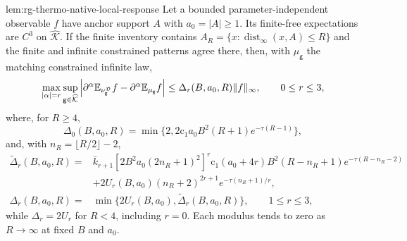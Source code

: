 {lem:rg-thermo-native-local-response}
Let a bounded parameter-independent observable $f$ have anchor support $A$
with $a_0=|A|\ge1$. Its finite-free expectations are $C^3$ on
$\widehat{\mathcal K}$. If the finite inventory contains
$A_R=\{x:\operatorname{dist}_\infty(x,A)\le R\}$ and the finite and infinite
constrained patterns agree there, then, with $\mu_{\mathsf g}$ the matching
constrained infinite law,
\begin{equation}
 \max_{|\alpha|=r}\sup_{\mathsf g\in\widehat{\mathcal K}}
 \left|\partial^\alpha\mathbb E_{\nu^{\mathfrak D}_{\mathsf g}}f-
       \partial^\alpha\mathbb E_{\mu_{\mathsf g}}f\right|
 \le\Delta_r(B,a_0,R)\|f\|_\infty,\qquad 0\le r\le3,
 \label{eq:rg-thermo-native-local-response-limit}
\end{equation}
where, for $R\ge4$,
\begin{equation}
 \Delta_0(B,a_0,R)=\min\{2,2\mathrm c_1a_0B^2(R+1)e^{-\tau(R-1)}\},
 \label{eq:rg-thermo-native-value-modulus}
\end{equation}
and, with $n_R=\lfloor R/2\rfloor-2$,
\begin{equation}
 \begin{split}
 \widetilde\Delta_r(B,a_0,R)={}&
 \bar k_{r+1}[2B^2a_0(2n_R+1)^2]^r
 \mathrm c_1(a_0+4r)B^2(R-n_R+1)e^{-\tau(R-n_R-2)}\\
 &+2U_r(B,a_0)(n_R+2)^{2r+1}e^{-\tau(n_R+1)/r},\\
 \Delta_r(B,a_0,R)={}&
 \min\{2U_r(B,a_0),\widetilde\Delta_r(B,a_0,R)\},
 \qquad 1\le r\le3,
 \end{split}
 \label{eq:rg-thermo-native-derivative-moduli}
\end{equation}
while $\Delta_r=2U_r$ for $R<4$, including $r=0$. Each modulus tends to zero
as $R\to\infty$ at fixed $B$ and $a_0$. 

